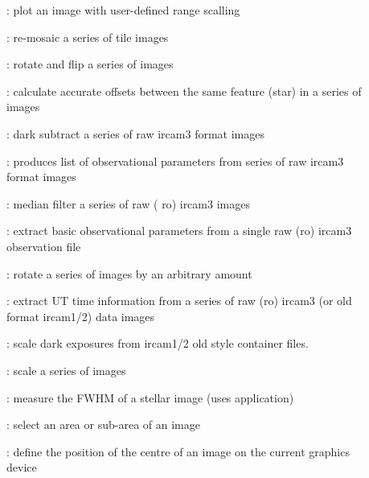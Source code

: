\begin{description}
\item []: plot an image with user-defined
range scalling

\item []: re-mosaic a series of tile images

\item []: rotate and flip a series of images

\item []: calculate accurate offsets between
the same feature (star) in a series of images

\item []: dark subtract a series of raw
{\sc ircam3} format images

\item []: produces list of observational
parameters from  series of raw {\sc ircam3} format images

\item []: median filter a series of raw ({\sc
ro}) {\sc ircam3} images

\item []: extract basic observational parameters
from a single raw ({\sc ro}) {\sc ircam3} observation file

\item []: rotate a series of images by an
arbitrary amount

\item []: extract UT time information from a series
of raw ({\sc ro}) {\sc ircam3} (or old format {\sc ircam1/2}) data
images

\item []: scale dark exposures from {\sc
ircam1/2} old style container files.

\item []: scale a series of images

\item []: measure the FWHM of a stellar image (uses
  application)

\item []: select an area or sub-area of an image

\item []: define the position of the centre of
an image on the current graphics device


\end{description}
